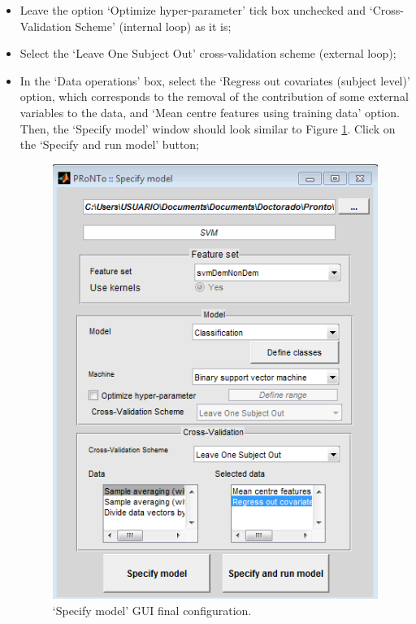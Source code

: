 \begin{itemize}
	\item Leave the option `Optimize hyper-parameter' tick box unchecked and `Cross-Validation Scheme' (internal loop) as it is; 
	
	\item Select the `Leave One Subject Out' cross-validation scheme (external loop);
	
	\item In the `Data operations' box, select the `Regress out covariates (subject level)' option, which corresponds to the removal of the contribution of some external variables to the data, and `Mean centre features using training data' option. Then, the `Specify model' window should look similar to Figure \ref{fig:finalModel}. Click on the `Specify and run model' button;
	
	\begin{figure}[!h]
	\centering
		\includegraphics[scale=0.65]{images/Tutorial/confounds/specify_model.png}
	\caption{`Specify model' GUI final configuration.}
	\label{fig:finalModel}
\end{figure}

	
\end{itemize}


